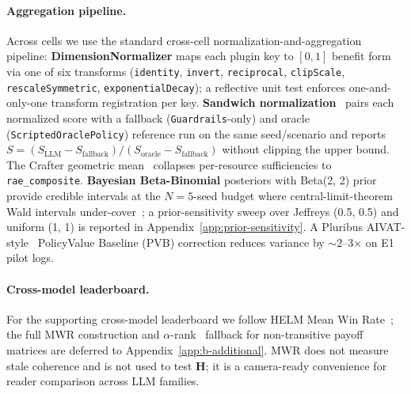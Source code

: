 \paragraph{Aggregation pipeline.} Across cells we use the standard
cross-cell normalization-and-aggregation pipeline:
\textbf{DimensionNormalizer} maps each plugin key to $[0, 1]$
benefit form via one of six transforms (\texttt{identity},
\texttt{invert}, \texttt{reciprocal}, \texttt{clipScale},
\texttt{rescaleSymmetric}, \texttt{exponentialDecay}); a reflective
unit test enforces one-and-only-one transform registration per key.
\textbf{Sandwich normalization}~\citep{Agapiou2022MeltingPot} pairs
each normalized score with a fallback (\texttt{Guardrails}-only) and
oracle (\texttt{ScriptedOraclePolicy}) reference run on the same
seed/scenario and reports
$S = (S_{\text{LLM}} - S_{\text{fallback}}) /
(S_{\text{oracle}} - S_{\text{fallback}})$ without clipping the
upper bound. The Crafter geometric mean~\citep{Hafner2022Crafter}
collapses per-resource sufficiencies to \texttt{rae\_composite}.
\textbf{Bayesian Beta-Binomial} posteriors with Beta(2, 2) prior
provide credible intervals at the $N=5$-seed budget where
central-limit-theorem Wald intervals
under-cover~\citep{Bowyer2025DontUseClt}; a prior-sensitivity sweep
over Jeffreys (0.5, 0.5) and uniform (1, 1) is reported in
Appendix~\ref{app:prior-sensitivity}. A Pluribus
AIVAT-style~\citep{Brown2019Pluribus} PolicyValue Baseline (PVB)
correction reduces variance by $\sim$2--3$\times$ on E1 pilot logs.

\paragraph{Cross-model leaderboard.} For the supporting
cross-model leaderboard we follow HELM Mean Win
Rate~\citep{Liang2023HELM}; the full MWR construction and
$\alpha$-rank~\citep{Lanctot2019OpenSpiel} fallback for
non-transitive payoff matrices are deferred to
Appendix~\ref{app:b-additional}. MWR does not measure stale
coherence and is not used to test $\mathbf{H}$; it is a
camera-ready convenience for reader comparison across LLM families.
